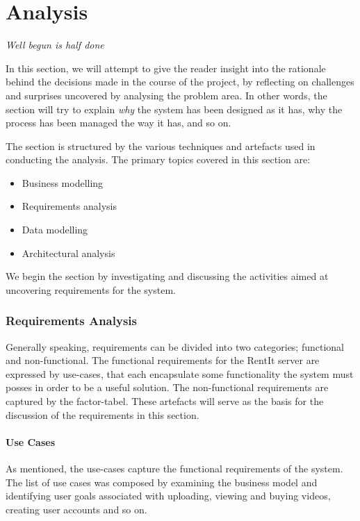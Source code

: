 \part{Analysis}
\vspace{30pt}
\begin{center}
\textit{Well begun is half done}
\end{center}
\vspace{30pt}
In this section, we will attempt to give the reader insight into the rationale behind the decisions made in the course of the project, by reflecting on challenges and surprises uncovered by analysing the problem area. In other words, the section will try to explain \textit{why} the system has been designed as it has, why the process has been managed the way it has, and so on.

The section is structured by the various techniques and artefacts used in conducting the analysis. The primary topics covered in this section are:
\begin{itemize}
\item Business modelling
\item Requirements analysis
\item Data modelling
\item Architectural analysis
\end{itemize}
We begin the section by investigating and discussing the activities aimed at uncovering requirements for the system.
\section{Requirements Analysis}
Generally speaking, requirements can be divided into two categories; functional and non-functional. The functional requirements for the RentIt server are expressed by use-cases, that each encapsulate some functionality the system must posses in order to be a useful solution. The non-functional requirements are captured by the factor-tabel.
  These artefacts will serve as the basis for the discussion of the requirements in this section.
\subsection{Use Cases}
As mentioned, the use-cases capture the functional requirements of the system. The list of use cases was composed by examining the business model and identifying user goals associated with uploading, viewing and buying videos, creating user accounts and so on.

